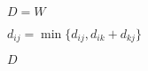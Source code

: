 
\begin{algorithm}[H]
  \begin{algorithmic}[1]
      \State $D = W$

      \hStatex
	    \State $d_{ij} = \min \Big\{ d_{ij}, d_{ik} + d_{kj} \Big\}$
	  \EndFor
	\EndFor
      \EndFor

      \hStatex
      \State \Return $D$
    \EndProcedure
  \end{algorithmic}
\end{algorithm}
